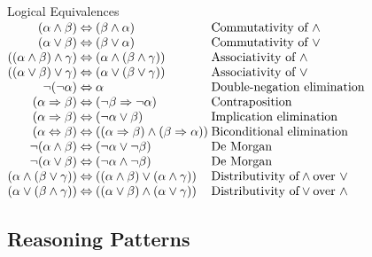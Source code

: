 \documentclass[14pt]{beamer}
\newcommand{\limpl}{\Rightarrow}
\newcommand{\liff}{\Leftrightarrow}
\begin{document}
\begin{frame}{Logical Equivalences}
	\small
	$
	\begin{array}{@{}r@{\hspace{.25em}}c@{\hspace{.25em}}l@{\hspace{.25em}}l}
	(\alpha \land \beta)                &\liff& (\beta \land \alpha)                             & \mbox{Commutativity of } \land\\
	(\alpha \lor \beta)                 &\liff& (\beta\lor \alpha)                               & \mbox{Commutativity of } \lor\\
	((\alpha \land \beta)\land \gamma)  &\liff& (\alpha\land (\beta\land \gamma))                & \mbox{Associativity of } \land\\
	((\alpha \lor \beta)\lor \gamma)    &\liff& (\alpha\lor (\beta\lor \gamma))                  & \mbox{Associativity of } \lor\\
	\lnot(\lnot \alpha)                 &\liff& \alpha                                           & \mbox{Double-negation elimination}\\
	(\alpha \limpl \beta)               &\liff& (\lnot \beta \limpl \lnot \alpha)                & \mbox{Contraposition}\\
	(\alpha \limpl \beta)               &\liff& (\lnot \alpha \lor \beta)                        & \mbox{Implication elimination}\\
	(\alpha \liff \beta)                &\liff& ((\alpha\limpl \beta)\land (\beta\limpl \alpha)) & \mbox{Biconditional elimination}\\
	\lnot(\alpha \land \beta)           &\liff& (\lnot \alpha \lor \lnot \beta)                  & \mbox{De Morgan}\\
	\lnot(\alpha \lor \beta)            &\liff& (\lnot \alpha \land \lnot \beta)                 & \mbox{De Morgan}\\
	(\alpha \land (\beta \lor \gamma))  &\liff& ((\alpha\land \beta)\lor (\alpha\land \gamma))   & \mbox{Distributivity of} \land \mbox{over } \lor\\
	(\alpha \lor (\beta \land \gamma))  &\liff& ((\alpha\lor \beta)\land (\alpha\lor \gamma))    & \mbox{Distributivity of} \lor \mbox{over } \land
	\end{array}
	$
\end{frame}


\subsection{Reasoning Patterns}
\end{document}
